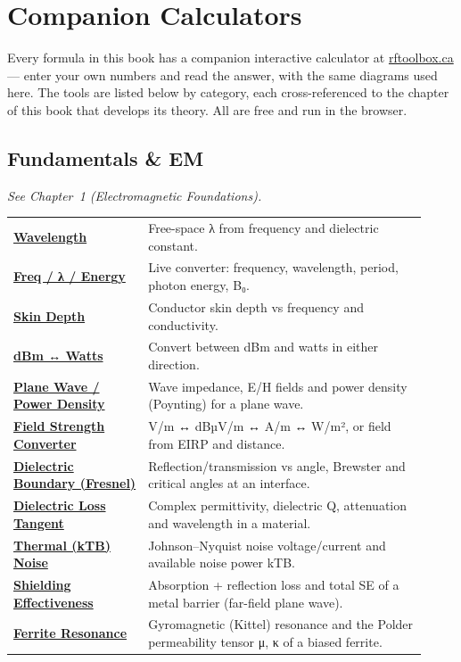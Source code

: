 \chapter{Companion Calculators}\label{ch:calculators}

Every formula in this book has a companion interactive calculator at
\href{https://rftoolbox.ca}{rftoolbox.ca} --- enter your own numbers and read the
answer, with the same diagrams used here. The tools are listed below by category,
each cross-referenced to the chapter of this book that develops its theory. All are
free and run in the browser.

\section*{Fundamentals \& EM}
\noindent\emph{See Chapter~1 (Electromagnetic Foundations).}
\begin{longtable}{>{\raggedright\arraybackslash}p{0.30\linewidth}>{\raggedright\arraybackslash}p{0.62\linewidth}}
\hline
\href{https://rftoolbox.ca/Wavelength.html}{\textbf{Wavelength}} & Free-space λ from frequency and dielectric constant. \\
\href{https://rftoolbox.ca/FreqEnergyConverter.html}{\textbf{Freq / λ / Energy}} & Live converter: frequency, wavelength, period, photon energy, B₀. \\
\href{https://rftoolbox.ca/SkinDepth.html}{\textbf{Skin Depth}} & Conductor skin depth vs frequency and conductivity. \\
\href{https://rftoolbox.ca/dBmConverter.html}{\textbf{dBm ↔ Watts}} & Convert between dBm and watts in either direction. \\
\href{https://rftoolbox.ca/PlaneWave.html}{\textbf{Plane Wave / Power Density}} & Wave impedance, E/H fields and power density (Poynting) for a plane wave. \\
\href{https://rftoolbox.ca/FieldStrength.html}{\textbf{Field Strength Converter}} & V/m ↔ dBµV/m ↔ A/m ↔ W/m², or field from EIRP and distance. \\
\href{https://rftoolbox.ca/DielectricBoundary.html}{\textbf{Dielectric Boundary (Fresnel)}} & Reflection/transmission vs angle, Brewster and critical angles at an interface. \\
\href{https://rftoolbox.ca/LossTangent.html}{\textbf{Dielectric Loss Tangent}} & Complex permittivity, dielectric Q, attenuation and wavelength in a material. \\
\href{https://rftoolbox.ca/ThermalNoise.html}{\textbf{Thermal (kTB) Noise}} & Johnson–Nyquist noise voltage/current and available noise power kTB. \\
\href{https://rftoolbox.ca/ShieldingEffectiveness.html}{\textbf{Shielding Effectiveness}} & Absorption + reflection loss and total SE of a metal barrier (far-field plane wave). \\
\href{https://rftoolbox.ca/KittelResonance.html}{\textbf{Ferrite Resonance}} & Gyromagnetic (Kittel) resonance and the Polder permeability tensor μ, κ of a biased ferrite. \\
\hline
\end{longtable}

